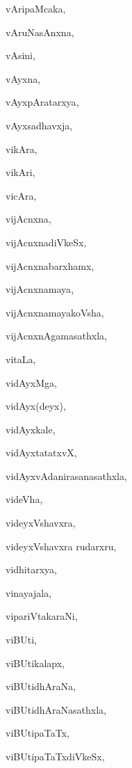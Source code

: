 \begin{multicols}{2}
{vAripaMcaka}, \pageref{vAripaMcaka}

{vAruNasAnxna}, \pageref{vAruNasAnxna}

{vAsini}, \pageref{vAsini}

{vAyxna}, \pageref{vAyxna}

{vAyxpAratarxya}, \pageref{vAyxpAratarxya}

{vAyxsadhavxja}, \pageref{vAyxsadhavxja}

{vikAra}, \pageref{vikAra}

{vikAri}, \pageref{vikAri}

{vicAra}, \pageref{vicAra}

{vijAcnxna}, \pageref{vijAcnxna}

{vijAcnxnadiVkeSx}, \pageref{vijAcnxnadiVkeSx}

{vijAcnxnabarxhamx}, \pageref{vijAcnxnabarxhamx}

{vijAcnxnamaya}, \pageref{vijAcnxnamaya}

{vijAcnxnamayakoVsha}, \pageref{vijAcnxnamayakoVsha}

{vijAcnxnAgamasathxla}, \pageref{vijAcnxnAgamasathxla}

{vitaLa}, \pageref{vitaLa}

{vidAyxMga}, \pageref{vidAyxMga}

{vidAyx(deyx)}, \pageref{vidAyxdeyx}

{vidAyxkale}, \pageref{vidAyxkale}

{vidAyxtatatxvX}, \pageref{vidAyxtatatxvX}

{vidAyxvAdanirasanasathxla}, \pageref{vidAyxvAdanirasanasathxla}

{videVha}, \pageref{videVha}

{videyxVshavxra}, \pageref{videyxVshavxra}

{videyxVshavxra rudarxru}, \pageref{videyxVshavxrarudarxru}

{vidhitarxya}, \pageref{vidhitarxya}

{vinayajala}, \pageref{vinayajala}

{vipariVtakaraNi}, \pageref{vipariVtakaraNi}

{viBUti}, \pageref{viBUti}

{viBUtikalapx}, \pageref{viBUtikalapx}

{viBUtidhAraNa}, \pageref{viBUtidhAraNa}

{viBUtidhAraNasathxla}, \pageref{viBUtidhAraNasathxla}

{viBUtipaTaTx}, \pageref{viBUtipaTaTx}

{viBUtipaTaTxdiVkeSx}, \pageref{viBUtipaTaTxdiVkeSx}


\end{multicols}
